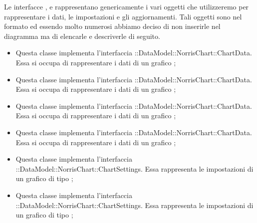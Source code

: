 	Le interfacce ,  \linebreak {} e  rappresentano genericamente i vari oggetti che utilizzeremo per rappresentare i dati, le impostazioni e gli aggiornamenti. Tali oggetti sono nel formato  ed essendo molto numerosi abbiamo deciso di non inserirle nel diagramma ma di elencarle e descriverle di seguito.

	\begin{itemize}
		\item {} Questa classe implementa l'interfaccia ::DataModel::NorrisChart::ChartData. Essa si occupa di rappresentare i dati di un grafico ;

		\item {} Questa classe implementa l'interfaccia ::DataModel::NorrisChart::ChartData. Essa si occupa di rappresentare i dati di un grafico ;

		\item {} Questa classe implementa l'interfaccia ::DataModel::NorrisChart::ChartData. Essa si occupa di rappresentare i dati di un grafico ;

		\item {} Questa classe implementa l'interfaccia \linebreak {}::DataModel::NorrisChart::ChartData. Essa si occupa di rappresentare i dati di un grafico ;

		\item {} Questa classe implementa l'interfaccia ::DataModel::NorrisChart::ChartSettings. Essa rappresenta le impostazioni di un grafico di tipo ;

		\item {} Questa classe implementa l'interfaccia ::DataModel::NorrisChart::ChartSettings. Essa rappresenta le impostazioni di un grafico di tipo ;


\end{itemize}

